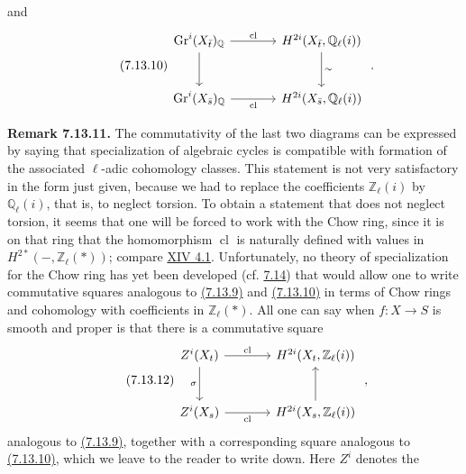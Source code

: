 and
\begin{equation}\tag{7.13.10}
\begin{tikzcd}[column sep=large,row sep=large]
\Gr^i(X_{\bar t})_{\mathbb Q} \arrow[r,"\operatorname{cl}"] \arrow[d] &
H^{2i}(X_{\bar t},\mathbb Q_\ell(i)) \arrow[d,"\sim"]\\
\Gr^i(X_{\bar s})_{\mathbb Q} \arrow[r,"\operatorname{cl}"'] &
H^{2i}(X_{\bar s},\mathbb Q_\ell(i))
\end{tikzcd}
\;.
\end{equation}

\textbf{Remark 7.13.11.}
The commutativity of the last two diagrams can be expressed by saying that
specialization of algebraic cycles is compatible with formation of the
associated $\ell$-adic cohomology classes. This statement is not very
satisfactory in the form just given, because we had to replace the
coefficients $\mathbb Z_\ell(i)$ by $\mathbb Q_\ell(i)$, that is, to neglect
torsion. To obtain a statement that does not neglect torsion, it seems that
one will be forced to work with the Chow ring, since it is on that ring that
the homomorphism $\operatorname{cl}$ is naturally defined with values in
$H^{2*}(-,\mathbb Z_\ell(*))$; compare \hyperlink{sga6.e14.para.4-1}{XIV 4.1}. Unfortunately, no theory of
specialization for the Chow ring has yet been developed (cf. \hyperlink{sga6.e10.sec.7.14}{7.14}) that would
allow one to write commutative squares analogous to \hyperlink{sga6.e10.eq.7-13-9}{(7.13.9)} and \hyperlink{sga6.e10.eq.7-13-10}{(7.13.10)} in
terms of Chow rings and cohomology with coefficients in
$\mathbb Z_\ell(*)$. All one can say when $f:X\to S$ is smooth and proper is
that there is a commutative square
\begin{equation}\tag{7.13.12}
\begin{tikzcd}[column sep=large,row sep=large]
Z^i(X_t) \arrow[r,"\operatorname{cl}"] \arrow[d,"\sigma"'] &
H^{2i}(X_t,\mathbb Z_\ell(i))\\
Z^i(X_s) \arrow[r,"\operatorname{cl}"'] &
H^{2i}(X_s,\mathbb Z_\ell(i)) \arrow[u]
\end{tikzcd}
\;,
\end{equation}
analogous to \hyperlink{sga6.e10.eq.7-13-9}{(7.13.9)}, together with a corresponding square analogous to
\hyperlink{sga6.e10.eq.7-13-10}{(7.13.10)}, which we leave to the reader to write down. Here $Z^i$ denotes the
